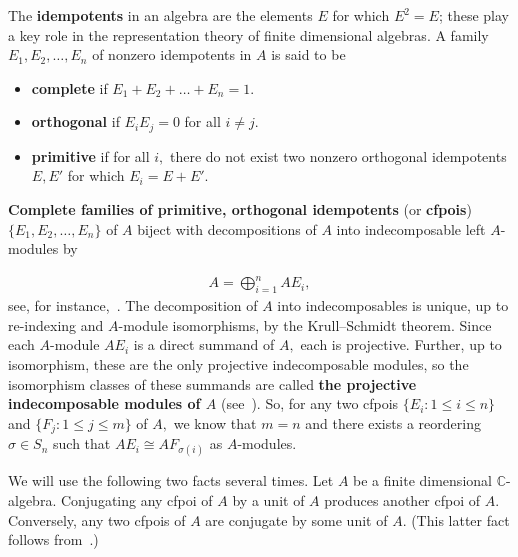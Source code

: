 \documentclass[ALCO, Unicode]{cedram}
\def\C{{\mathbb{C}}}
\begin{document}
The \textbf{idempotents} in an algebra are the elements $E$ for which $E^2 = E$; these  play a key role in the representation theory of finite dimensional algebras. A family $E_1, E_2, \ldots, E_n$ of nonzero idempotents in $A$ is said to be 
\begin{itemize}
    \item \textbf{complete} if $E_1 + E_2 + \ldots + E_n = 1.$
    \item \textbf{orthogonal} if $E_iE_j = 0$ for all $i \neq j.$
    \item \textbf{primitive} if for all $i,$ there do not exist two nonzero orthogonal idempotents $E, E'$ for which $E_i = E + E'.$
\end{itemize}

\textbf{Complete families of primitive, orthogonal idempotents} (or \textbf{cfpois})  $\{E_1, E_2, \ldots, E_n\}$ of $A$ biject with decompositions of $A$ into indecomposable left $A$-modules by

\begin{align*}
    A = \bigoplus_{i = 1}^n A E_i,
\end{align*}
 see, for instance,~\cite[Proposition 7.2.1]{webbrepntheory}. The decomposition of $A$ into indecomposables is unique, up to re-indexing and $A$-module isomorphisms, by the Krull--Schmidt theorem. Since each $A$-module $AE_i$ is a direct summand of $A,$ each is projective. Further, up to isomorphism, these are the only projective indecomposable modules, so the isomorphism classes of these summands are called \textbf{the projective indecomposable modules of $A$} (see~\cite[Lemma I.5.3(b)]{assem}). So, for any two cfpois $\{E_i: 1 \leq i \leq n\} $ and $\{F_j: 1 \leq j \leq m\}$ of $A,$ we know that $m = n$ and there exists a reordering $\sigma \in S_n$ such that $AE_i \cong AF_{\sigma(i)}$ as $A$-modules.  

 \begin{rema}\label{rem:conjugation-idems}
   We will use the following two facts several times. Let $A$ be a finite dimensional $\C$-algebra.  Conjugating any cfpoi of $A$ by a unit of $A$ produces another cfpoi of $A$. Conversely, any two cfpois of $A$ are conjugate by some unit of $A$. (This latter fact follows from~\cite[Lemma D.26 and its preceding discussion]{Aguiar-Mahajan}.)
\end{rema}
\end{document}
